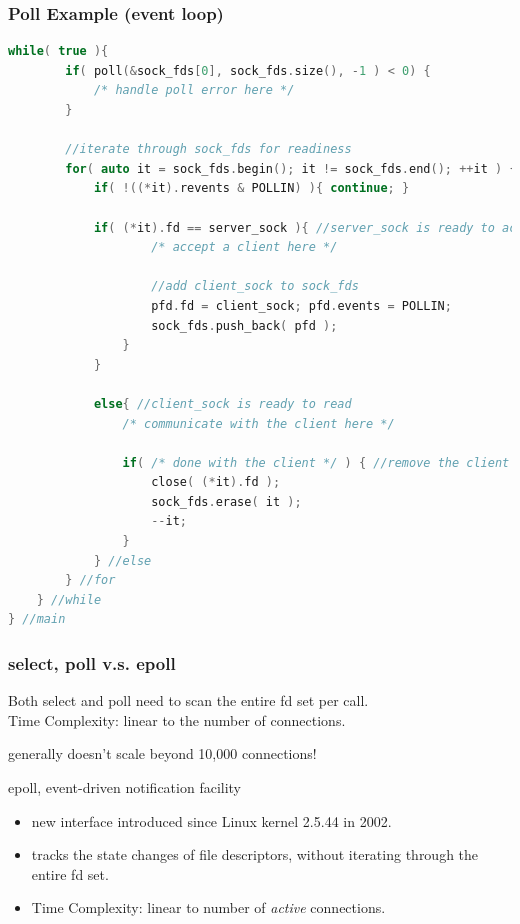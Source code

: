 \documentclass[aspectratio=43]{beamer}
\begin{document}
\begin{frame}[fragile]
  \frametitle{Poll Example (event loop)}
\begin{lstlisting}[language=C++,basicstyle=\ttfamily\tiny,commentstyle=\color{commgreen},keywordstyle=\color{blue},breaklines=true]
    while( true ){  
        if( poll(&sock_fds[0], sock_fds.size(), -1 ) < 0) {
            /* handle poll error here */
        }
    
        //iterate through sock_fds for readiness
        for( auto it = sock_fds.begin(); it != sock_fds.end(); ++it ) {            
            if( !((*it).revents & POLLIN) ){ continue; }

            if( (*it).fd == server_sock ){ //server_sock is ready to accept
                    /* accept a client here */
                    
                    //add client_sock to sock_fds
                    pfd.fd = client_sock; pfd.events = POLLIN;
                    sock_fds.push_back( pfd );
                }       
            }

            else{ //client_sock is ready to read
                /* communicate with the client here */
                
                if( /* done with the client */ ) { //remove the client from poll queue
                    close( (*it).fd );
                    sock_fds.erase( it );
                    --it;
                }
            } //else
        } //for
    } //while
} //main

\end{lstlisting}
\end{frame}

\begin{frame}[fragile]
  \frametitle{select, poll v.s. epoll}
     Both select and poll need to scan the entire fd set per call.\\
     Time Complexity: linear to the number of connections.\\
     \begin{center}
     \large generally doesn't scale beyond 10,000 connections!
     \end{center}
     
     epoll, event-driven notification facility
     \begin{itemize}
     \item new interface introduced since Linux kernel 2.5.44 in 2002.
     \item tracks the state changes of file descriptors, without iterating through the entire fd set.
     \item Time Complexity: linear to number of \emph{active} connections.
     \end{itemize}
\end{frame}
\end{document}
